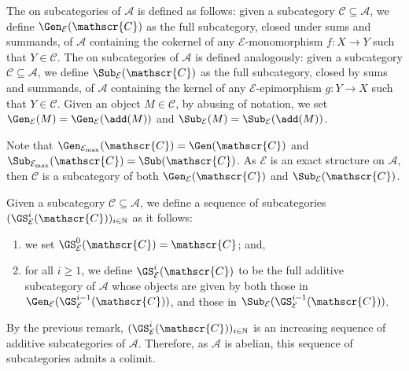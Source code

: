 The  on subcategories of $\mathscr{A}$ is defined as follows: given a subcategory $\mathscr{C} \subseteq \mathscr{A}$, we define $\Gen_\mathcal{E}(\mathscr{C})$ as the full subcategory, closed under sums and summands, of $\mathscr{A}$ containing the cokernel of any $\mathcal{E}$-monomorphism $f : X \longrightarrow Y$ such that $Y \in \mathscr{C}$. The  on subcategories of $\mathscr{A}$ is defined analogously: given a subcategory $\mathscr{C} \subseteq \mathscr{A}$, we define $\Sub_\mathcal{E}(\mathscr{C})$ as the full subcategory, closed by sums and summands, of $\mathscr{A}$ containing the kernel of any $\mathcal{E}$-epimorphism $g : Y \longrightarrow X$  such that $Y \in \mathscr{C}$. Given an object $M \in \mathscr{C}$, by abusing of notation, we set $\Gen_\mathcal{E}(M) = \Gen_\mathcal{E}(\add(M))$ and $\Sub_\mathcal{E}(M) = \Sub_\mathcal{E}(\add(M))$.

Note that $\Gen_{\mathcal{E}_{\max}}(\mathscr{C}) = \Gen(\mathscr{C})$ and $\Sub_{\mathcal{E}_{\max}}(\mathscr{C}) = \Sub(\mathscr{C})$. As $\mathcal{E}$ is an exact structure on $\mathscr{A}$, then $\mathscr{C}$ is a subcategory of both $\Gen_\mathcal{E}(\mathscr{C})$ and $\Sub_\mathcal{E}(\mathscr{C})$. %

Given a subcategory $\mathscr{C} \subseteq \mathscr{A}$, we define a sequence of subcategories $(\GS_{\mathcal{E}}^i(\mathscr{C}))_{i\in \mathbb{N}}$ as it follows:
\begin{enumerate}[label=$\bullet$, itemsep=1mm]
    \item we set $\GS_{\mathcal{E}}^0(\mathscr{C}) = \mathscr{C}$; and,
    \item for all $i \geqslant 1$, we define $\GS^{i}_{\mathcal{E}}(\mathscr{C})$ to be the full additive subcategory of $\mathscr{A}$ whose objects are given by both those in $\Gen_{\mathcal{E}}(\GS^{i-1}_{\mathcal{E}}(\mathscr{C}))$, and those in $\Sub_{\mathcal{E}}(\GS^{i-1}_{\mathcal{E}}(\mathscr{C}))$.
\end{enumerate}
By the previous remark, $(\GS_{\mathcal{E}}^i(\mathscr{C}))_{i\in \mathbb{N}}$ is an increasing sequence of additive subcategories of $\mathscr{A}$. Therefore, as $\mathscr{A}$ is abelian, this sequence of subcategories admits a colimit.

